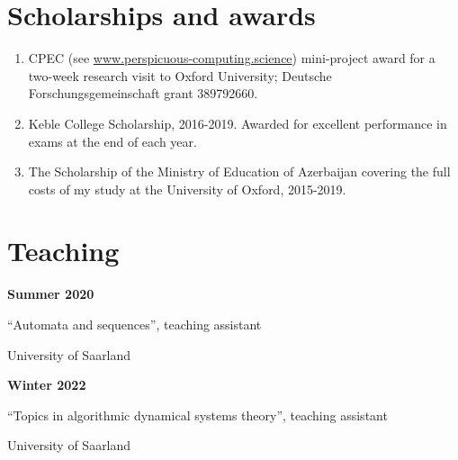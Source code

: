 \documentclass{article}
\begin{document}
	\section*{Scholarships and awards}
	\begin{enumerate}
		\item CPEC (see \url{www.perspicuous-computing.science}) mini-project award for a two-week research visit to Oxford University; Deutsche Forschungsgemeinschaft grant 389792660.
		\item Keble College Scholarship, 2016-2019. Awarded for excellent performance in exams at the end of each year.
		\item The Scholarship of the Ministry of Education of Azerbaijan covering the full costs of my study at the University of Oxford, 2015-2019.
	\end{enumerate}
	
	\section*{Teaching}
	\noindent\begin{minipage}{0.3\textwidth}
		\hspace{0.5cm} \textbf{Summer 2020}
	\end{minipage}
	\begin{minipage}{0.7\textwidth}
		``Automata and sequences'', teaching assistant 
		
		University of Saarland
	\end{minipage}
	
	\vspace{0.3cm}
	
	\noindent\begin{minipage}{0.3\textwidth}
		\hspace{0.5cm} \textbf{Winter 2022}
	\end{minipage}
	\begin{minipage}{0.7\textwidth}
		``Topics in algorithmic dynamical systems theory'', teaching assistant 
		
		University of Saarland
	\end{minipage}

      

    
\end{document}
